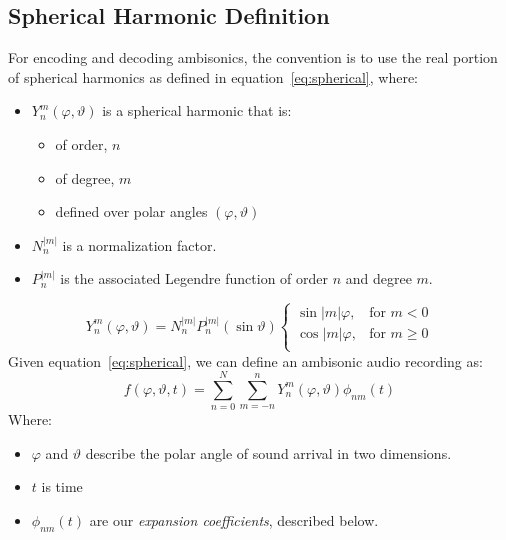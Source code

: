 \subsection{Spherical Harmonic Definition}
For encoding and decoding ambisonics, the convention is to use the
real portion of spherical harmonics as defined in
equation~\ref{eq:spherical}, where:
\begin{itemize}
\item $Y_{n}^{m}(\varphi,\vartheta)$ is a spherical harmonic that
is:
\begin{itemize}
\item of order, $n$
\item of degree, $m$
\item defined over polar angles $(\varphi, \vartheta)$
\end{itemize}
\item $N_n^{|m|}$ is a normalization factor.\cite{Nachbar2011}
\item $P_n^{|m|}$ is the associated Legendre function of order $n$
  and degree $m$.
\end{itemize}
\begin{equation}
Y_{n}^{m}(\varphi,\vartheta)=N_n^{|m|}P_n^{|m|}(\sin{\vartheta})
\begin{cases}\label{eq:spherical}
\sin{|m|\varphi},&  \text{for $m<0$}\\  
\cos{|m|\varphi},& \text{for $m\geq 0$}\\
\end{cases}
\end{equation}
Given equation~\ref{eq:spherical}, we can define an ambisonic
audio recording as:
\begin{equation}
f(\varphi,\vartheta,t)=\sum\limits_{n=0}^N\sum\limits_{m=-n}^nY_n^m(\varphi,\vartheta)\phi_{nm}(t)
\label{eq:ambisonics}
\end{equation}
Where:
\begin{itemize}
\item $\varphi$ and $\vartheta$ describe the polar angle of sound
  arrival in two dimensions.
\item $t$ is time
\item $\phi_{nm}(t)$ are our \textit{expansion coefficients}, described
  below.
\end{itemize}
